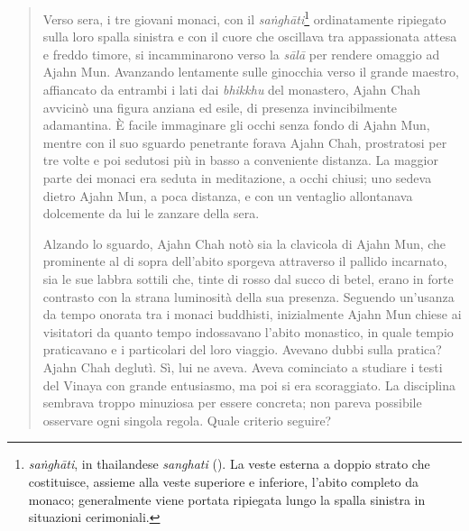\begin{quote}
Verso sera, i tre giovani monaci, con il \emph{saṅghāti}\footnote{\emph{saṅghāti},
  in thailandese \emph{sanghati} (). La veste esterna a doppio
  strato che costituisce, assieme alla veste superiore e inferiore,
  l'abito completo da monaco; generalmente viene portata ripiegata lungo
  la spalla sinistra in situazioni cerimoniali.} ordinatamente ripiegato
sulla loro spalla sinistra e con il cuore che oscillava tra appassionata
attesa e freddo timore, si incamminarono verso la \emph{sālā} per
rendere omaggio ad Ajahn Mun. Avanzando lentamente sulle ginocchia verso
il grande maestro, affiancato da entrambi i lati dai \emph{bhikkhu} del
monastero, Ajahn Chah avvicinò una figura anziana ed esile, di presenza
invincibilmente adamantina. È facile immaginare gli occhi senza fondo di
Ajahn Mun, mentre con il suo sguardo penetrante forava Ajahn Chah,
prostratosi per tre volte e poi sedutosi più in basso a conveniente
distanza. La maggior parte dei monaci era seduta in meditazione, a occhi
chiusi; uno sedeva dietro Ajahn Mun, a poca distanza, e con un ventaglio
allontanava dolcemente da lui le zanzare della sera.

Alzando lo sguardo, Ajahn Chah notò sia la clavicola di Ajahn Mun, che
prominente al di sopra dell'abito sporgeva attraverso il pallido
incarnato, sia le sue labbra sottili che, tinte di rosso dal succo di
betel, erano in forte contrasto con la strana luminosità della sua
presenza. Seguendo un'usanza da tempo onorata tra i monaci buddhisti,
inizialmente Ajahn Mun chiese ai visitatori da quanto tempo indossavano
l'abito monastico, in quale tempio praticavano e i particolari del loro
viaggio. Avevano dubbi sulla pratica? Ajahn Chah deglutì. Sì, lui ne
aveva. Aveva cominciato a studiare i testi del Vinaya con grande
entusiasmo, ma poi si era scoraggiato. La disciplina sembrava troppo
minuziosa per essere concreta; non pareva possibile osservare ogni
singola regola. Quale criterio seguire?


\end{quote}
